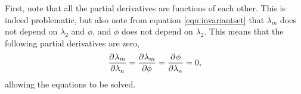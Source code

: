 First, note that all the partial derivatives are functions of each other. This is indeed problematic, but also note from equation \ref{eqn:invariantset} that $\lambda_m$ does not depend on $\lambda_2$ and $\phi$, and $\phi$ does not depend on $\lambda_2$. This means that the following partial derivatives are zero,
\begin{equation}\label{eqn:henckystraindependence}
\begin{aligned}
\dpd{\lambda_m}{\lambda_n} = \dpd{\lambda_m}{\phi} = \dpd{\phi}{\lambda_n} = 0,
\end{aligned}
\end{equation}
allowing the equations to be solved. 

